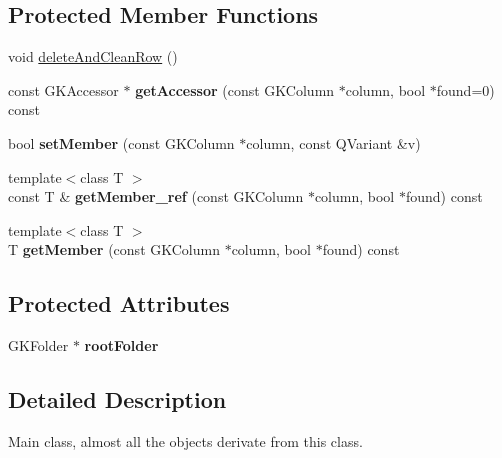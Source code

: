 \subsection*{Protected Member Functions}
\begin{DoxyCompactItemize}
\item 
void \hyperlink{classGKObject_a89de1ba900e5547145cdecae30c83238}{delete\+And\+Clean\+Row} ()
\item 
const G\+K\+Accessor $\ast$ {\bfseries get\+Accessor} (const G\+K\+Column $\ast$column, bool $\ast$found=0) const \hypertarget{classGKObject_ae9944d06a2adc2d8a62247d4fb84ab1d}{}\label{classGKObject_ae9944d06a2adc2d8a62247d4fb84ab1d}

\item 
bool {\bfseries set\+Member} (const G\+K\+Column $\ast$column, const Q\+Variant \&v)\hypertarget{classGKObject_a94e2486112d1966192de4ef656590bf8}{}\label{classGKObject_a94e2486112d1966192de4ef656590bf8}

\item 
{\footnotesize template$<$class T $>$ }\\const T \& {\bfseries get\+Member\+\_\+ref} (const G\+K\+Column $\ast$column, bool $\ast$found) const \hypertarget{classGKObject_a3e60c199a6cad40c4846ae0d4510d915}{}\label{classGKObject_a3e60c199a6cad40c4846ae0d4510d915}

\item 
{\footnotesize template$<$class T $>$ }\\T {\bfseries get\+Member} (const G\+K\+Column $\ast$column, bool $\ast$found) const \hypertarget{classGKObject_a2c74822669db204a2f9760df6beaadd6}{}\label{classGKObject_a2c74822669db204a2f9760df6beaadd6}

\end{DoxyCompactItemize}
\subsection*{Protected Attributes}
\begin{DoxyCompactItemize}
\item 
G\+K\+Folder $\ast$ {\bfseries root\+Folder}\hypertarget{classGKObject_adf0a0724ecfdce4a81060338808713a0}{}\label{classGKObject_adf0a0724ecfdce4a81060338808713a0}

\end{DoxyCompactItemize}


\subsection{Detailed Description}
Main class, almost all the objects derivate from this class. 

